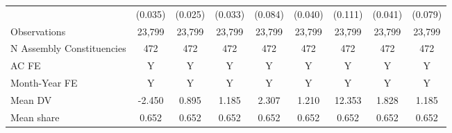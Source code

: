 {\begin{tabular}{l*{8}{c}}
            &     (0.035)         &     (0.025)         &     (0.033)         &     (0.084)         &     (0.040)         &     (0.111)         &     (0.041)         &     (0.079)         \\
Observations&      23,799         &      23,799         &      23,799         &      23,799         &      23,799         &      23,799         &      23,799         &      23,799         \\
N Assembly Constituencies&         472         &         472         &         472         &         472         &         472         &         472         &         472         &         472         \\
AC FE       &           Y         &           Y         &           Y         &           Y         &           Y         &           Y         &           Y         &           Y         \\
Month-Year FE&           Y         &           Y         &           Y         &           Y         &           Y         &           Y         &           Y         &           Y         \\
Mean DV     &      -2.450         &       0.895         &       1.185         &       2.307         &       1.210         &      12.353         &       1.828         &       1.185         \\
Mean share  &       0.652         &       0.652         &       0.652         &       0.652         &       0.652         &       0.652         &       0.652         &       0.652         \\
\bottomrule
\end{tabular}
}
